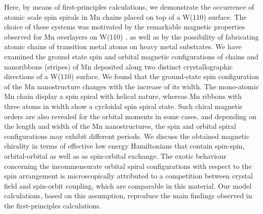 \documentclass[prl,final,twocolumn]{revtex4-1}
\begin{document}
  
Here, by means of first-principles calculations, we demonstrate the occurrence of atomic scale spin spirals in Mn chains placed on top of a W(110) surface.
The choice of these systems was motivated by the remarkable magnetic properties observed for Mn overlayers on W(110) \cite{yoshida2012conical,bode2007chiral}, as well as by the possibility of fabricating atomic chains of transition metal atoms on heavy metal substrates.
We have examined the ground state spin and orbital magnetic configurations of chains and nanoribbons (stripes) of Mn deposited along two distinct crystallographic directions of a W(110) surface. We found that the ground-state spin configuration of the Mn nanostructure changes with the increase of its  width. The mono-atomic Mn chain display a spin spiral with helical nature, whereas Mn ribbons with three atoms in width show a cycloidal spin spiral state. 
% 
Such chiral magnetic orders are also revealed for the orbital moments in some cases, and depending on the length and width of the Mn nanostructures, the spin and orbital spiral configurations may exhibit different periods.  
We discuss the obtained magnetic chirality in terms of 
effective low energy Hamiltonians that contain spin-spin, orbital-orbital as well as as spin-orbital exchange.
%
The exotic behaviour concerning the incommensurate orbital spiral configurations with respect to the spin arrangement is microscopically attributed to a competition between crystal field and spin-orbit coupling, which are comparable in this material. Our model calculations, based on this assumption, reproduce the main findings observed in the first-principles calculations.

\end{document}
